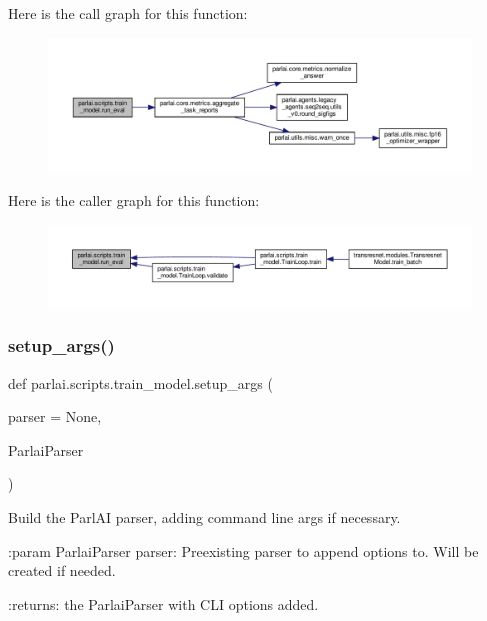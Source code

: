 Here is the call graph for this function\+:
\nopagebreak
\begin{figure}[H]
\begin{center}
\leavevmode
\includegraphics[width=350pt]{namespaceparlai_1_1scripts_1_1train__model_a496dfe3bf04da9b55d261b4c8d6229a7_cgraph}
\end{center}
\end{figure}
Here is the caller graph for this function\+:
\nopagebreak
\begin{figure}[H]
\begin{center}
\leavevmode
\includegraphics[width=350pt]{namespaceparlai_1_1scripts_1_1train__model_a496dfe3bf04da9b55d261b4c8d6229a7_icgraph}
\end{center}
\end{figure}
\mbox{\label{namespaceparlai_1_1scripts_1_1train__model_a5130cce2fb2a33694a2537d800ad9e9e}} 
\subsubsection{\texorpdfstring{setup\+\_\+args()}{setup\_args()}}
{\footnotesize\ttfamily def parlai.\+scripts.\+train\+\_\+model.\+setup\+\_\+args (\begin{DoxyParamCaption}\item[{}]{parser = {\ttfamily None},  }\item[{}]{Parlai\+Parser }\end{DoxyParamCaption})}

\begin{DoxyVerb}Build the ParlAI parser, adding command line args if necessary.

:param ParlaiParser parser:
    Preexisting parser to append options to. Will be created if needed.

:returns:
    the ParlaiParser with CLI options added.
\end{DoxyVerb}
 


